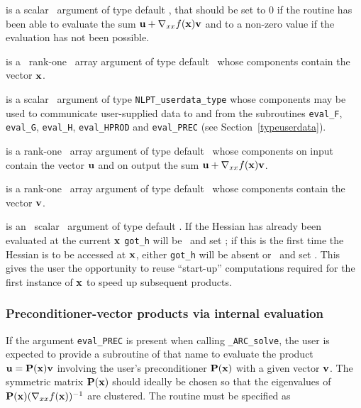 \documentclass{galahad}
\newcommand{\packagename}{ARC}
\newcommand{\fullpackagename}{\libraryname\_\packagename}
\newcommand{\solver}{{\tt \fullpackagename\_solve}}
\begin{document}
\begin{description}
 is a scalar \intentout\ argument of type default \integer,
that should be set to 0 if the routine has been able to evaluate the
sum ${\mathbf{u}} + \nabla_{xx} f({\mathbf{x}}) {\mathbf{v}}$
and to a non-zero value if the evaluation has not been possible.

 is a \ rank-one \intentin\ array argument of type
default \realdp\ whose components contain the vector ${\mathbf{x}}$.

 is a scalar \intentinout\ argument of type
{\tt NLPT\_userdata\_type} whose components may be used
to communicate user-supplied data to and from the
subroutines {\tt eval\_F}, {\tt eval\_G},
{\tt eval\_H}, {\tt eval\_HPROD} and {\tt eval\_PREC}
(see Section~\ref{typeuserdata}).

 is a rank-one \intentinout\ array argument of type default \realdp\
whose components on input contain the vector ${\mathbf{u}}$ and on output the
sum ${\mathbf{u}} + \nabla_{xx} f({\mathbf{x}}) {\mathbf{v}}$.

 is a rank-one \intentin\ array argument of type default \realdp\
whose components contain the vector ${\mathbf{v}}$.

 is an \optional\ scalar \intentin\ argument of type default
\logical. If the Hessian has already been evaluated at the current ${\mathbf{x}}$
{\tt got\_h} will be \present\ and set \true; if this is the first time
the Hessian is to be accessed at ${\mathbf{x}}$, either {\tt got\_h} will be absent
or \present\ and set \false. This gives the user the opportunity
to reuse ``start-up'' computations required for the first instance of
${\mathbf{x}}$ to speed up subsequent products.

\end{description}


\subsubsection{Preconditioner-vector products via internal evaluation\label{pv}}

If the argument {\tt eval\_PREC} is present when calling \solver, the
user is expected to provide a subroutine of that name to evaluate the
product ${\mathbf{u}} = {\mathbf{P}}({\mathbf{x}}) {\mathbf{v}}$ involving the user's preconditioner
${\mathbf{P}}({\mathbf{x}})$ with a given vector ${\mathbf{v}}$. The symmetric matrix ${\mathbf{P}}({\mathbf{x}})$
should ideally be chosen so that the eigenvalues of
${\mathbf{P}}({\mathbf{x}}) (\nabla_{xx} f({\mathbf{x}}))^{-1}$ are clustered.
The routine must be specified as
\end{document}
